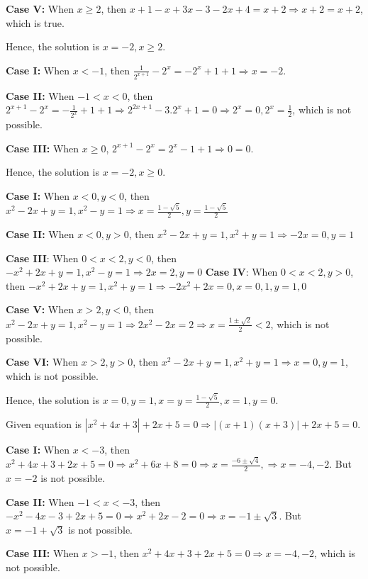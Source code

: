   {\bf Case V:} When $x \geq 2$, then $x + 1 - x + 3x - 3 - 2x + 4 = x + 2 \Rightarrow x + 2 = x + 2$, which
  is true.

  Hence, the solution is $x = -2, x\geq 2$.
\item {\bf Case I:} When $x < -1$, then $\frac{1}{2^{x + 1}} - 2^x = -2^x + 1 + 1 \Rightarrow x = -2$.

  {\bf Case II:} When $-1 < x < 0$, then $2^{x + 1} - 2^x = -\frac{1}{2^x} + 1 + 1\Rightarrow 2^{2x + 1} -
  3.2^x + 1 = 0 \Rightarrow 2^x = 0, 2^x = \frac{1}{2}$, which is not possible.

  {\bf Case III:} When $x \geq 0$, $2^{x  + 1} - 2^x = 2^x - 1 + 1 \Rightarrow 0 = 0$.

  Hence, the solution is $x = -2, x \geq 0$.
\item {\bf Case I:} When $x < 0, y < 0$, then $x^2 - 2x + y = 1, x^2 - y = 1 \Rightarrow x = \frac{1 -
  \sqrt{5}}{2}, y = \frac{1 - \sqrt{5}}{2}$

  {\bf Case II:} When $x < 0, y > 0$, then $x^2 - 2x + y = 1, x^2 + y = 1\Rightarrow -2x = 0, y = 1$

  {\bf Case III}: When $0 < x < 2, y < 0$, then $-x^2 + 2x + y = 1, x^2 - y = 1\Rightarrow 2x = 2, y = 0$
  {\bf Case IV}: When $0 < x < 2, y > 0$, then $-x^2 + 2x + y = 1, x^2 + y = 1\Rightarrow -2x^2 + 2x = 0, x
  = 0, 1, y = 1, 0$

  {\bf Case V:} When $x > 2, y < 0$, then $x^2 - 2x + y = 1, x^2 - y = 1\Rightarrow 2x^2 - 2x = 2
  \Rightarrow x = \frac{1 \pm\sqrt{2}}{2} < 2$, which is not possible.

  {\bf Case VI:} When $x > 2, y > 0$, then $x^2 - 2x + y = 1, x^2 + y = 1\Rightarrow x = 0, y = 1$, which is
  not possible.

  Hence, the solution is $x = 0, y = 1, x = y = \frac{1 -\sqrt{5}}{2}, x = 1, y = 0$.
\item Given equation is $|x^2 + 4x + 3| + 2x + 5 = 0\Rightarrow |(x + 1)(x + 3)| + 2x + 5 = 0$.

  {\bf Case I:} When $x < -3$, then $x^2 + 4x + 3 + 2x + 5 = 0 \Rightarrow x^2 + 6x + 8 = 0 \Rightarrow x =
  \frac{-6\pm\sqrt{4}}{2}, \Rightarrow x = -4, -2$. But $x = -2$ is not possible.

  {\bf Case II:} When $-1 < x < -3$, then $-x^2 - 4x - 3 + 2x + 5 = 0 \Rightarrow x^2 + 2x - 2 = 0
  \Rightarrow x = -1\pm\sqrt{3}$. But $x = -1 + \sqrt{3}$ is not possible.

  {\bf Case III:} When $x > -1$, then $x^2 + 4x + 3 + 2x + 5 = 0 \Rightarrow x = -4, -2$, which is not
  possible.

